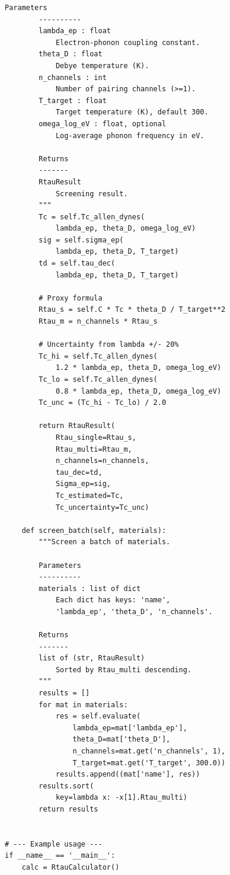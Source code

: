 \documentclass[prb,twocolumn,superscriptaddress,longbibliography,floatfix]{revtex4-2}
\begin{document}
\begin{lstlisting}[caption={rtau\_calculator.py --- $R_\tau$ screening tool.}]
        Parameters
        ----------
        lambda_ep : float
            Electron-phonon coupling constant.
        theta_D : float
            Debye temperature (K).
        n_channels : int
            Number of pairing channels (>=1).
        T_target : float
            Target temperature (K), default 300.
        omega_log_eV : float, optional
            Log-average phonon frequency in eV.

        Returns
        -------
        RtauResult
            Screening result.
        """
        Tc = self.Tc_allen_dynes(
            lambda_ep, theta_D, omega_log_eV)
        sig = self.sigma_ep(
            lambda_ep, theta_D, T_target)
        td = self.tau_dec(
            lambda_ep, theta_D, T_target)

        # Proxy formula
        Rtau_s = self.C * Tc * theta_D / T_target**2
        Rtau_m = n_channels * Rtau_s

        # Uncertainty from lambda +/- 20%
        Tc_hi = self.Tc_allen_dynes(
            1.2 * lambda_ep, theta_D, omega_log_eV)
        Tc_lo = self.Tc_allen_dynes(
            0.8 * lambda_ep, theta_D, omega_log_eV)
        Tc_unc = (Tc_hi - Tc_lo) / 2.0

        return RtauResult(
            Rtau_single=Rtau_s,
            Rtau_multi=Rtau_m,
            n_channels=n_channels,
            tau_dec=td,
            Sigma_ep=sig,
            Tc_estimated=Tc,
            Tc_uncertainty=Tc_unc)

    def screen_batch(self, materials):
        """Screen a batch of materials.

        Parameters
        ----------
        materials : list of dict
            Each dict has keys: 'name',
            'lambda_ep', 'theta_D', 'n_channels'.

        Returns
        -------
        list of (str, RtauResult)
            Sorted by Rtau_multi descending.
        """
        results = []
        for mat in materials:
            res = self.evaluate(
                lambda_ep=mat['lambda_ep'],
                theta_D=mat['theta_D'],
                n_channels=mat.get('n_channels', 1),
                T_target=mat.get('T_target', 300.0))
            results.append((mat['name'], res))
        results.sort(
            key=lambda x: -x[1].Rtau_multi)
        return results


# --- Example usage ---
if __name__ == '__main__':
    calc = RtauCalculator()


\end{lstlisting}
\end{document}
